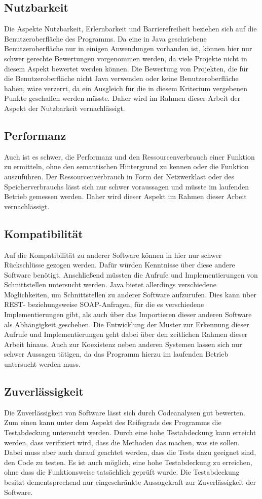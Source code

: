 \documentclass[
	oneside,  %
	ngerman, 
	final, 
	11pt, 
	a4paper, 
	1.1headlines, 
	headinclude=false, 
	footinclude=false, 
	mpinclude=false, 
	pagesize, 
	onecolumn, 
	titlepage, 
	parskip=half, 
	headsepline, 
	chapterprefix=false, 
	version=first, 
	listof=totoc, 
	bibliography=totoc, 
	toc=graduated, 
	fleqn
]{scrbook}
\begin{document}
\subsection{Nutzbarkeit}
Die Aspekte Nutzbarkeit, Erlernbarkeit und Barrierefreiheit beziehen sich auf die Benutzeroberfläche des Programms.
Da eine in Java geschriebene Benutzeroberfläche nur in einigen Anwendungen vorhanden ist, können hier nur schwer gerechte Bewertungen vorgenommen werden, da viele Projekte nicht in diesem Aspekt bewertet werden können.
Die Bewertung von Projekten, die für die Benutzeroberfläche nicht Java verwenden oder keine Benutzeroberfläche haben, wäre verzerrt, da ein Ausgleich für die in diesem Kriterium vergebenen Punkte geschaffen werden müsste.
Daher wird im Rahmen dieser Arbeit der Aspekt der Nutzbarkeit vernachlässigt.

\subsection{Performanz}
Auch ist es schwer, die Performanz und den Ressourcenverbrauch einer Funktion zu ermitteln, ohne den semantischen Hintergrund zu kennen oder die Funktion auszuführen.
Der Ressourcenverbrauch in Form der Netzwerklast oder des Speicherverbrauchs lässt sich nur schwer voraussagen und müsste im laufenden Betrieb gemessen werden.
Daher wird dieser Aspekt im Rahmen dieser Arbeit vernachlässigt.

\subsection{Kompatibilität}
Auf die Kompatibilität zu anderer Software können in hier nur schwer Rückschlüsse gezogen werden.
Dafür würden Kenntnisse über diese andere Software benötigt.
Anschließend müssten die Aufrufe und Implementierungen von Schnittstellen untersucht werden.
Java bietet allerdings verschiedene Möglichkeiten, um Schnittstellen zu anderer Software aufzurufen.
Dies kann über \acf{REST}- beziehungsweise \acf{SOAP}-Anfragen, für die es verschiedene Implementierungen gibt, als auch über das Importieren dieser anderen Software als Abhängigkeit geschehen.
Die Entwicklung der Muster zur Erkennung dieser Aufrufe und Implementierungen geht dabei über den zeitlichen Rahmen dieser Arbeit hinaus.
Auch zur Koexistenz neben anderen Systemen lassen sich nur schwer Aussagen tätigen, da das Programm hierzu im laufenden Betrieb untersucht werden muss.

\subsection{Zuverlässigkeit}
Die Zuverlässigkeit von Software lässt sich durch Codeanalysen gut bewerten.
Zum einen kann unter dem Aspekt des Reifegrads des Programms die Testabdeckung untersucht werden.
Durch eine hohe Testabdeckung kann erreicht werden, dass verifiziert wird, dass die Methoden das machen, was sie sollen.
Dabei muss aber auch darauf geachtet werden, dass die Tests dazu geeignet sind, den Code zu testen.
Es ist auch möglich, eine hohe Testabdeckung zu erreichen, ohne dass die Funktionsweise tatsächlich geprüft wurde.
Die Testabdeckung besitzt dementsprechend nur eingeschränkte Aussagekraft zur Zuverlässigkeit der Software.
\end{document}
